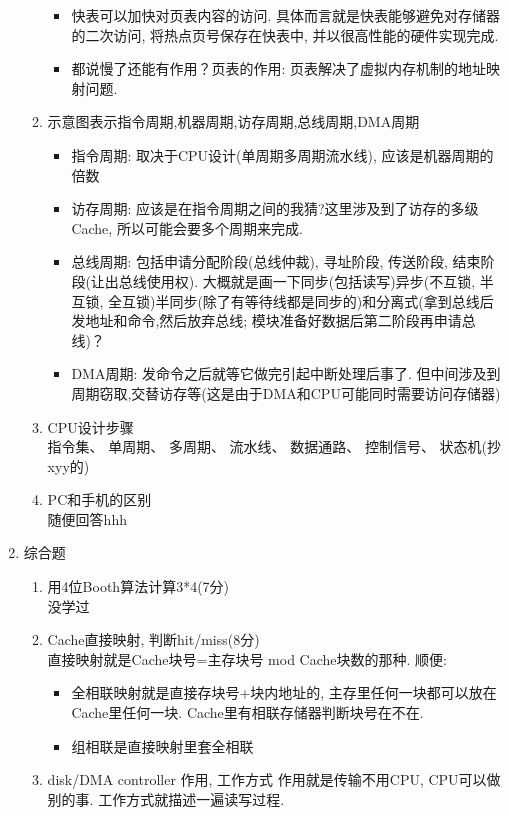 \documentclass[UTF8]{article}
\begin{document}
\begin{enumerate}[I]
\begin{enumerate}[1]
		\begin{itemize}
		\item 快表可以加快对页表内容的访问. 具体而言就是快表能够避免对存储器的二次访问, 将热点页号保存在快表中, 并以很高性能的硬件实现完成.
		\item 都说慢了还能有作用？页表的作用: 页表解决了虚拟内存机制的地址映射问题.
		\end{itemize}
	\item 示意图表示指令周期,机器周期,访存周期,总线周期,DMA周期
		\begin{itemize}
		\item 指令周期: 取决于CPU设计(单周期多周期流水线), 应该是机器周期的倍数
		\item 访存周期: 应该是在指令周期之间的我猜?这里涉及到了访存的多级Cache, 所以可能会要多个周期来完成.
		\item 总线周期: 包括申请分配阶段(总线仲裁), 寻址阶段, 传送阶段, 结束阶段(让出总线使用权). 大概就是画一下同步(包括读写)异步(不互锁, 半互锁, 全互锁)半同步(除了有等待线都是同步的)和分离式(拿到总线后发地址和命令,然后放弃总线; 模块准备好数据后第二阶段再申请总线)？
		\item DMA周期: 发命令之后就等它做完引起中断处理后事了. 但中间涉及到周期窃取,交替访存等(这是由于DMA和CPU可能同时需要访问存储器)
		\end{itemize}
	\item CPU设计步骤\\
		指令集、 单周期、 多周期、 流水线、 数据通路、 控制信号、 状态机(抄xyy的)
	\item PC和手机的区别\\
		随便回答hhh
	\end{enumerate}
\item 综合题
	\begin{enumerate}[1]
	\item 用4位Booth算法计算3*4(7分)\\
		没学过
	\item Cache直接映射, 判断hit/miss(8分)\\
		直接映射就是Cache块号=主存块号 mod Cache块数的那种.
		顺便: 
		\begin{itemize}
		\item 全相联映射就是直接存块号+块内地址的, 主存里任何一块都可以放在Cache里任何一块. Cache里有相联存储器判断块号在不在.
		\item 组相联是直接映射里套全相联
		\end{itemize}
	\item disk/DMA controller 作用, 工作方式
		作用就是传输不用CPU, CPU可以做别的事. 工作方式就描述一遍读写过程.

\end{enumerate}
\end{enumerate}
\end{document}
